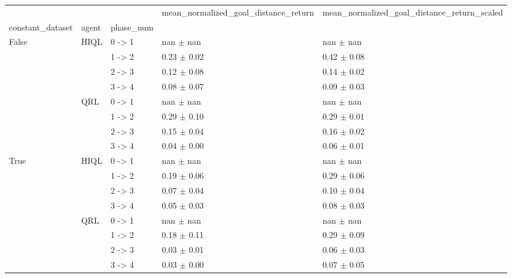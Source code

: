 \begin{tabular}{lllll}
\toprule
 &  &  & mean_normalized_goal_distance_return & mean_normalized_goal_distance_return_scaled \\
constant_dataset & agent & phase_num &  &  \\
\midrule
\multirow[t]{8}{*}{False} & \multirow[t]{4}{*}{HIQL} & 0 -> 1 & nan $\pm$ nan & nan $\pm$ nan \\
 &  & 1 -> 2 & 0.23 $\pm$ 0.02 & 0.42 $\pm$ 0.08 \\
 &  & 2 -> 3 & 0.12 $\pm$ 0.08 & 0.14 $\pm$ 0.02 \\
 &  & 3 -> 4 & 0.08 $\pm$ 0.07 & 0.09 $\pm$ 0.03 \\
\cline{2-5}
 & \multirow[t]{4}{*}{QRL} & 0 -> 1 & nan $\pm$ nan & nan $\pm$ nan \\
 &  & 1 -> 2 & 0.29 $\pm$ 0.10 & 0.29 $\pm$ 0.01 \\
 &  & 2 -> 3 & 0.15 $\pm$ 0.04 & 0.16 $\pm$ 0.02 \\
 &  & 3 -> 4 & 0.04 $\pm$ 0.00 & 0.06 $\pm$ 0.01 \\
\cline{1-5} \cline{2-5}
\multirow[t]{8}{*}{True} & \multirow[t]{4}{*}{HIQL} & 0 -> 1 & nan $\pm$ nan & nan $\pm$ nan \\
 &  & 1 -> 2 & 0.19 $\pm$ 0.06 & 0.29 $\pm$ 0.06 \\
 &  & 2 -> 3 & 0.07 $\pm$ 0.04 & 0.10 $\pm$ 0.04 \\
 &  & 3 -> 4 & 0.05 $\pm$ 0.03 & 0.08 $\pm$ 0.03 \\
\cline{2-5}
 & \multirow[t]{4}{*}{QRL} & 0 -> 1 & nan $\pm$ nan & nan $\pm$ nan \\
 &  & 1 -> 2 & 0.18 $\pm$ 0.11 & 0.29 $\pm$ 0.09 \\
 &  & 2 -> 3 & 0.03 $\pm$ 0.01 & 0.06 $\pm$ 0.03 \\
 &  & 3 -> 4 & 0.03 $\pm$ 0.00 & 0.07 $\pm$ 0.05 \\
\cline{1-5} \cline{2-5}
\bottomrule
\end{tabular}
